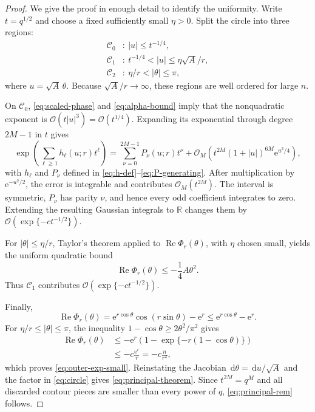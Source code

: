 \documentclass[11pt,a4paper]{article}
\theoremstyle{definition}
\newcommand{\ee}{\mathrm e}
\newcommand{\dd}{\,\mathrm d}
\newcommand{\bigO}{\mathcal O}
\DeclareMathOperator{\RePart}{Re}
\begin{document}
\begin{proof}
We give the proof in enough detail to identify the uniformity.  Write
$t=q^{1/2}$ and choose a fixed sufficiently small $\eta>0$.  Split the circle
into three regions:
\begin{align*}
 \mathcal C_0&:\ |u|\le t^{-1/4},\\
 \mathcal C_1&:\ t^{-1/4}<|u|\le \eta\sqrt A/r,\\
 \mathcal C_2&:\ \eta/r<|\theta|\le\pi,
\end{align*}
where $u=\sqrt A\,\theta$.  Because $\sqrt A/r\to\infty$, these regions are
well ordered for large $n$.

On $\mathcal C_0$, \eqref{eq:scaled-phase} and
\eqref{eq:alpha-bound} imply that the nonquadratic exponent is
$\bigO(t|u|^3)=\bigO(t^{1/4})$.  Expanding its exponential through degree
$2M-1$ in $t$ gives
\begin{equation}\label{eq:central-expansion-proof}
 \exp\!\left(\sum_{\ell\ge1}h_\ell(u;r)t^\ell\right)
 =\sum_{\nu=0}^{2M-1}P_\nu(u;r)t^\nu
 +\bigO_M\!\left(t^{2M}(1+|u|)^{6M}\ee^{u^2/4}\right),
\end{equation}
with $h_\ell$ and $P_\nu$ defined in
\eqref{eq:h-def}--\eqref{eq:P-generating}.  After multiplication by
$\ee^{-u^2/2}$, the error is integrable and contributes $\bigO_M(t^{2M})$.
The interval is symmetric, $P_\nu$ has parity $\nu$, and hence every odd
coefficient integrates to zero.  Extending the resulting Gaussian integrals
to $\mathbb R$ changes them by
$\bigO(\exp\{-c t^{-1/2}\})$.

For $|\theta|\le\eta/r$, Taylor's theorem applied to
$\RePart\Phi_r(\theta)$, with $\eta$ chosen small, yields the uniform quadratic
bound
\begin{equation}\label{eq:local-decay}
 \RePart\Phi_r(\theta)\le-\frac14A\theta^2.
\end{equation}
Thus $\mathcal C_1$ contributes
$\bigO(\exp\{-c t^{-1/2}\})$.

Finally,
\begin{equation}\label{eq:global-real-bound}
 \RePart\Phi_r(\theta)
 =\ee^{r\cos\theta}\cos(r\sin\theta)-\ee^r
 \le \ee^{r\cos\theta}-\ee^r.
\end{equation}
For $\eta/r\le|\theta|\le\pi$, the inequality
$1-\cos\theta\ge2\theta^2/\pi^2$ gives
\begin{align*}
 \RePart\Phi_r(\theta)
 &\le-\ee^r\left(1-\exp\{-r(1-\cos\theta)\}\right)\\
 &\le-c\frac{\ee^r}{r}
 =-c\frac{n}{r^2},
\end{align*}
which proves \eqref{eq:outer-exp-small}.  Reinstating the Jacobian
$\dd\theta=\dd u/\sqrt A$ and the factor in \eqref{eq:circle} gives
\eqref{eq:principal-theorem}.  Since $t^{2M}=q^M$ and all discarded contour
pieces are smaller than every power of $q$, \eqref{eq:principal-rem} follows.
\end{proof}
\end{document}
